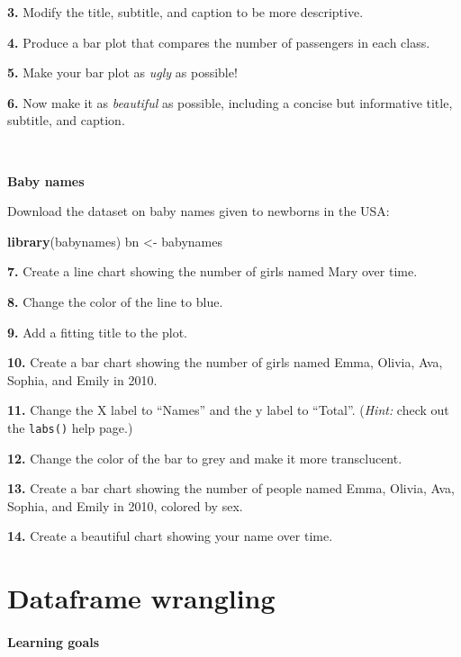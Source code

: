\documentclass[
]{book}
\newenvironment{Shaded}{\begin{snugshade}}{\end{snugshade}}
\newcommand{\KeywordTok}[1]{\textcolor[rgb]{0.13,0.29,0.53}{\textbf{#1}}}
\newcommand{\NormalTok}[1]{#1}
\newcommand{\StringTok}[1]{\textcolor[rgb]{0.31,0.60,0.02}{#1}}
\begin{document}
\textbf{3.} Modify the title, subtitle, and caption to be more descriptive.

\textbf{4.} Produce a bar plot that compares the number of passengers in each class.

\textbf{5.} Make your bar plot as \emph{ugly} as possible!

\textbf{6.} Now make it as \emph{beautiful} as possible, including a concise but informative title, subtitle, and caption.

~

\textbf{Baby names}

Download the dataset on baby names given to newborns in the USA:

\begin{Shaded}
\begin{Highlighting}[]
\KeywordTok{library}\NormalTok{(babynames)}
\NormalTok{bn <-}\StringTok{ }\NormalTok{babynames}
\end{Highlighting}
\end{Shaded}

\textbf{7.} Create a line chart showing the number of girls named Mary over time.

\textbf{8.} Change the color of the line to blue.

\textbf{9.} Add a fitting title to the plot.

\textbf{10.} Create a bar chart showing the number of girls named Emma, Olivia, Ava, Sophia, and Emily in 2010.

\textbf{11.} Change the X label to ``Names'' and the y label to ``Total''. (\emph{Hint:} check out the \texttt{labs()} help page.)

\textbf{12.} Change the color of the bar to grey and make it more transclucent.

\textbf{13.} Create a bar chart showing the number of people named Emma, Olivia, Ava, Sophia, and Emily in 2010, colored by sex.

\textbf{14.} Create a beautiful chart showing your name over time.

\hypertarget{dplyr}{%
\chapter{Dataframe wrangling}\label{dplyr}}

\hypertarget{learning-goals-10}{%
\subsubsection*{Learning goals}\label{learning-goals-10}}
\end{document}

